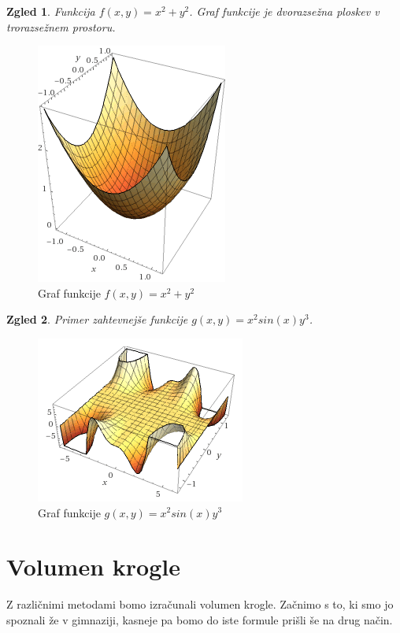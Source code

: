 \documentclass[12pt, a4paper]{article}
\newtheorem{zgled}{Zgled}
\begin{document}
\begin{zgled}
Funkcija $f(x,y)=x^2+y^2$. Graf funkcije je dvorazsežna ploskev v trorazsežnem prostoru.
\end{zgled}

\begin{figure}[h!]
\centering
\includegraphics{slika_funkcije.PNG}
\caption{Graf funkcije $f(x,y)=x^2+y^2$}
\end{figure}

\newpage
\begin{zgled}
Primer zahtevnejše funkcije $g(x,y)=x^2 sin(x)y^3$. 
\end{zgled}

\begin{figure}[h!]
\centering
\includegraphics{funkcija_2.PNG}
\caption{Graf funkcije $g(x,y)=x^2 sin(x)y^3$}
\end{figure}

\section{Volumen krogle}

Z različnimi metodami bomo izračunali volumen krogle. Začnimo s to, ki smo jo spoznali že v gimnaziji, kasneje pa bomo do iste formule prišli še na drug način. 
\end{document}
